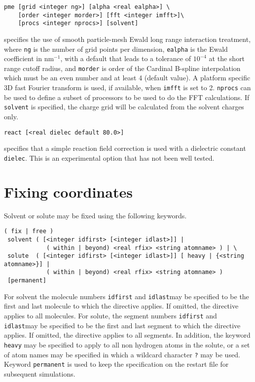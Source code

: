 \begin{description}
\item
\begin{verbatim}
pme [grid <integer ng>] [alpha <real ealpha>] \
    [order <integer morder>] [fft <integer imfft>]\
    [procs <integer nprocs>] [solvent]
\end{verbatim}
specifies the use of smooth particle-mesh Ewald long range
interaction treatment,
where \verb+ng+ is the number of grid points per dimension, 
\verb+ealpha+ is the Ewald coefficient in nm$^{-1}$, with a default
that leads to a tolerance of $10^{-4}$ at the short range cutoff radius, 
and \verb+morder+ is order of the Cardinal B-spline
interpolation which must be an even number and at least 4 (default
value). A platform specific 3D fast Fourier transform is used, if
available, when \verb+imfft+ is set to 2. \verb+nprocs+ can be used to
define a subset of processors to be used to do the FFT calculations.
If \verb+solvent+ is specified, the charge grid will be calculated from
the solvent charges only.

\item
\begin{verbatim}
react [<real dielec default 80.0>]
\end{verbatim}
specifies that a simple reaction field correction is used with a
dielectric constant \verb+dielec+. This is an
experimental option that has not been well tested.

\end{description}

\section{Fixing coordinates}
Solvent or solute may be fixed using the following keywords. 
\begin{description}
\item
\begin{verbatim}
( fix | free ) 
 solvent ( [<integer idfirst> [<integer idlast>]] | 
            ( within | beyond) <real rfix> <string atomname> ) | \
 solute  ( [<integer idfirst> [<integer idlast>]] [ heavy | {<string atomname>}] |
            ( within | beyond) <real rfix> <string atomname> )
 [permanent]
\end{verbatim}
For solvent the molecule numbers \verb+idfirst+ and \verb+idlast+may be 
specified to be the first and last molecule to which the directive
applies. If omitted, the directive applies to all molecules. For solute,
the segment numbers \verb+idfirst+ and \verb+idlast+may be 
specified to be the first and last segment to which the directive
applies. If omitted, the directive applies to all segments. In addition,
the keyword \verb+heavy+ may be specified to apply to all non hydrogen
atoms in the solute, or a set of atom names may be specified in which
a wildcard character \verb+?+ may be used. Keyword \verb+permanent+
is used to keep the specification on the restart file for subsequent
simulations.
\end{description}

